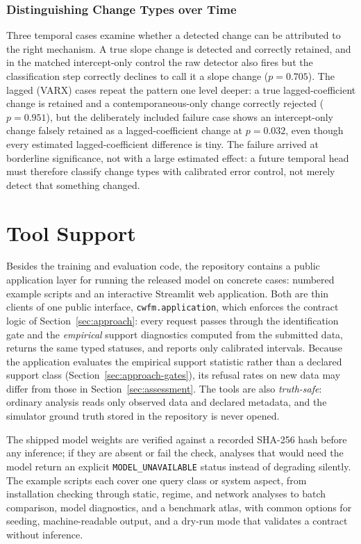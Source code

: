 \documentclass[electronics,article,submit,oneauthor]{Definitions/mdpi}
\begin{document}
\subsubsection{Distinguishing Change Types over Time}
Three temporal cases examine whether a detected change can be attributed to the right mechanism. A true slope change is detected and correctly retained, and in the matched intercept-only control the raw detector also fires but the classification step correctly declines to call it a slope change ($p = 0.705$). The lagged (VARX) cases repeat the pattern one level deeper: a true lagged-coefficient change is retained and a contemporaneous-only change correctly rejected ($p = 0.951$), but the deliberately included failure case shows an intercept-only change falsely retained as a lagged-coefficient change at $p = 0.032$, even though every estimated lagged-coefficient difference is tiny. The failure arrived at borderline significance, not with a large estimated effect: a future temporal head must therefore classify change types with calibrated error control, not merely detect that something changed.



\section{Tool Support}\label{sec:tools}

Besides the training and evaluation code, the repository contains a public application layer for running the released model on concrete cases: numbered example scripts and an interactive Streamlit web application. Both are thin clients of one public interface, \texttt{cwfm.application}, which enforces the contract logic of Section~\ref{sec:approach}: every request passes through the identification gate and the \emph{empirical} support diagnostics computed from the submitted data, returns the same typed statuses, and reports only calibrated intervals. Because the application evaluates the empirical support statistic rather than a declared support class (Section~\ref{sec:approach-gates}), its refusal rates on new data may differ from those in Section~\ref{sec:assessment}. The tools are also \emph{truth-safe}: ordinary analysis reads only observed data and declared metadata, and the simulator ground truth stored in the repository is never opened.

The shipped model weights are verified against a recorded SHA-256 hash before any inference; if they are absent or fail the check, analyses that would need the model return an explicit \texttt{MODEL\_UNAVAILABLE} status instead of degrading silently. The example scripts each cover one query class or system aspect, from installation checking through static, regime, and network analyses to batch comparison, model diagnostics, and a benchmark atlas, with common options for seeding, machine-readable output, and a dry-run mode that validates a contract without inference.
\end{document}
